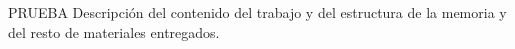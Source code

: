 PRUEBA
Descripción del contenido del trabajo y del estructura de la memoria y del resto de materiales entregados.

